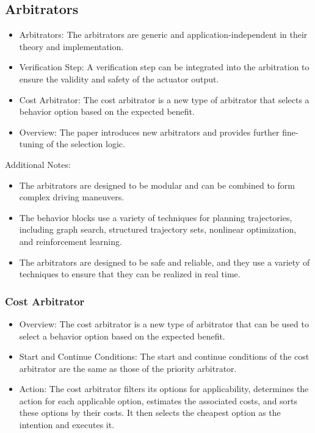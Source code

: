 \subsection{Arbitrators}

\begin{itemize}
    \item Arbitrators: The arbitrators are generic and application-independent in their theory and implementation.
    \item Verification Step: A verification step can be integrated into the arbitration to ensure the validity and safety of the actuator output.
    \item Cost Arbitrator: The cost arbitrator is a new type of arbitrator that selects a behavior option based on the expected benefit.
    \item Overview: The paper introduces new arbitrators and provides further fine-tuning of the selection logic.
\end{itemize}

Additional Notes:
\begin{itemize}
    \item The arbitrators are designed to be modular and can be combined to form complex driving maneuvers.
    \item The behavior blocks use a variety of techniques for planning trajectories, including graph search, structured trajectory sets, nonlinear optimization, and reinforcement learning.
    \item The arbitrators are designed to be safe and reliable, and they use a variety of techniques to ensure that they can be realized in real time.
\end{itemize}

\subsubsection*{Cost Arbitrator}

\begin{itemize}
    \item Overview: The cost arbitrator is a new type of arbitrator that can be used to select a behavior option based on the expected benefit.
    \item Start and Continue Conditions: The start and continue conditions of the cost arbitrator are the same as those of the priority arbitrator.
    \item Action: The cost arbitrator filters its options for applicability, determines the action for each applicable option, estimates the associated costs, and sorts these options by their costs. It then selects the cheapest option as the intention and executes it.
\end{itemize}

